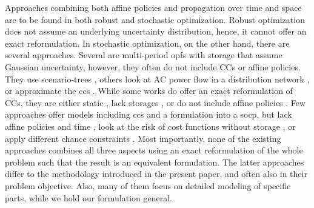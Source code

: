 \documentclass[final,3p,times,twocolumn]{elsarticle}  %
\begin{document}
Approaches combining both affine policies and propagation over time and space are to be found in both robust and stochastic optimization. Robust optimization does not assume an underlying uncertainty distribution, hence, it cannot offer an exact reformulation. In stochastic optimization, on the other hand, there are several approaches. 
Several are multi-period \glspl{opf} with storage that assume Gaussian uncertainty, however, they often do not include CCs or affine policies. They use scenario-trees \cite{hemmati_stochastic_2016}, others look at AC power flow in a distribution network \cite{ayyagari_chance_2017}, or approximate the \glspl{cc} \cite{summers_stochastic_2015, li_analytical_2015}. While some works do offer an exact reformulation of CCs, they are either static \cite{bienstock_chance_2012}, lack storages \cite{bienstock_chance_2012, roald_analytical_2013}, or do not include affine policies \cite{sjodin_risk-mitigated_2012}.
Few approaches offer models including \glspl{cc} and a formulation into a \gls{socp}, but lack affine policies and time \cite{zhang_distributionally_2017}, look at the risk of cost functions without storage \cite{xie_distributionally_2018}, or apply different chance constraints \cite{Warrington13}. 
Most importantly, none of the existing approaches combines all three aspects using an exact reformulation of the whole problem such that the result is an equivalent formulation.
The latter approaches differ to the methodology introduced in the present paper, and often also in their problem objective. Also, many of them focus on detailed modeling of specific parts, while we hold our formulation general.
\end{document}
